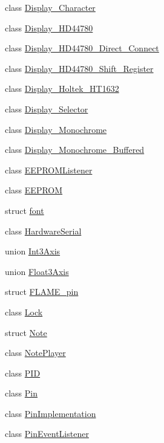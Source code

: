 \begin{DoxyCompactItemize}
\item 
class \hyperlink{classflame_1_1_display___character}{Display\-\_\-\-Character}
\item 
class \hyperlink{classflame_1_1_display___h_d44780}{Display\-\_\-\-H\-D44780}
\item 
class \hyperlink{classflame_1_1_display___h_d44780___direct___connect}{Display\-\_\-\-H\-D44780\-\_\-\-Direct\-\_\-\-Connect}
\item 
class \hyperlink{classflame_1_1_display___h_d44780___shift___register}{Display\-\_\-\-H\-D44780\-\_\-\-Shift\-\_\-\-Register}
\item 
class \hyperlink{classflame_1_1_display___holtek___h_t1632}{Display\-\_\-\-Holtek\-\_\-\-H\-T1632}
\item 
class \hyperlink{classflame_1_1_display___selector}{Display\-\_\-\-Selector}
\item 
class \hyperlink{classflame_1_1_display___monochrome}{Display\-\_\-\-Monochrome}
\item 
class \hyperlink{classflame_1_1_display___monochrome___buffered}{Display\-\_\-\-Monochrome\-\_\-\-Buffered}
\item 
class \hyperlink{classflame_1_1_e_e_p_r_o_m_listener}{E\-E\-P\-R\-O\-M\-Listener}
\item 
class \hyperlink{classflame_1_1_e_e_p_r_o_m}{E\-E\-P\-R\-O\-M}
\item 
struct \hyperlink{structflame_1_1font}{font}
\item 
class \hyperlink{classflame_1_1_hardware_serial}{Hardware\-Serial}
\item 
union \hyperlink{unionflame_1_1_int3_axis}{Int3\-Axis}
\item 
union \hyperlink{unionflame_1_1_float3_axis}{Float3\-Axis}
\item 
struct \hyperlink{structflame_1_1_f_l_a_m_e__pin}{F\-L\-A\-M\-E\-\_\-pin}
\item 
class \hyperlink{classflame_1_1_lock}{Lock}
\item 
struct \hyperlink{structflame_1_1_note}{Note}
\item 
class \hyperlink{classflame_1_1_note_player}{Note\-Player}
\item 
class \hyperlink{classflame_1_1_p_i_d}{P\-I\-D}
\item 
class \hyperlink{classflame_1_1_pin}{Pin}
\item 
class \hyperlink{classflame_1_1_pin_implementation}{Pin\-Implementation}
\item 
class \hyperlink{classflame_1_1_pin_event_listener}{Pin\-Event\-Listener}

\end{DoxyCompactItemize}
